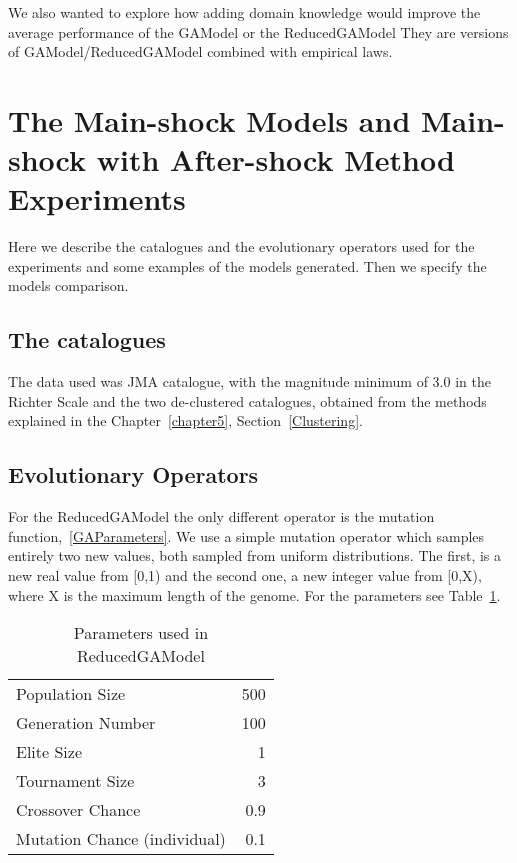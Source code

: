 We also wanted to explore how adding domain knowledge would improve the average performance of the GAModel or the ReducedGAModel They are versions of GAModel/ReducedGAModel combined with empirical laws.\\ 

\section{The Main-shock Models and Main-shock with After-shock Method Experiments}
 Here we describe the catalogues and the evolutionary operators used for the experiments and some examples of the models generated. Then we specify the models comparison.\\
 
\subsection{The catalogues}

The data used was JMA catalogue, with the magnitude minimum of 3.0 in the Richter Scale and the two de-clustered catalogues, obtained from the methods explained in the Chapter~\ref{chapter5}, Section~\ref{Clustering}.\\ 

\subsection{Evolutionary Operators}

For the ReducedGAModel the only different operator is the mutation function,~\ref{GAParameters}. We use a simple mutation operator which samples entirely two new values, both sampled from uniform distributions. The first, is a new real value from [0,1) and the second one, a new integer value from [0,X), where X is the maximum length of the genome. For the parameters see Table~\ref{GAHParameters}.\\

\begin{table}[!ht]
	\caption{Parameters used in ReducedGAModel}
	\label{GAHParameters}
	\begin{center}
		\begin{tabular}{|l|r|}
			\hline
			Population Size & 500\\
			Generation Number & 100\\
			Elite Size & 1\\
			Tournament Size & 3\\
			Crossover Chance & 0.9\\
			Mutation Chance (individual) & 0.1\\
			\hline    
		\end{tabular}
	\end{center}
\end{table}

